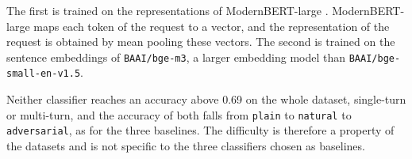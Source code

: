 The first is trained on the representations of ModernBERT-large \cite{warnerSmarterBetterFaster2024}. ModernBERT-large maps each token of the request to a vector, and the representation of the request is obtained by mean pooling these vectors. The second is trained on the sentence embeddings of \texttt{BAAI/bge-m3}, a larger embedding model than \texttt{BAAI/bge-small-en-v1.5}.

Neither classifier reaches an accuracy above 0.69 on the whole dataset, single-turn or multi-turn, and the accuracy of both falls from \texttt{plain} to \texttt{natural} to \texttt{adversarial}, as for the three baselines. The difficulty is therefore a property of the datasets and is not specific to the three classifiers chosen as baselines.
